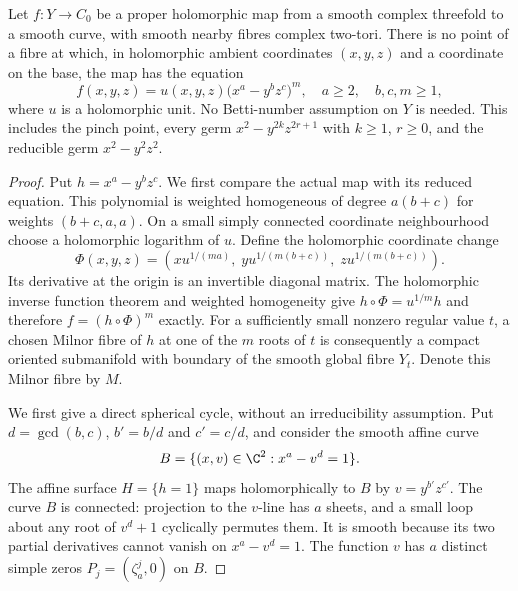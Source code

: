 
\begin{proposition}\label{cdp:st:A.5.15}
Let $f:Y\to C_0$ be a proper holomorphic map from a
smooth complex threefold to a smooth curve, with smooth
nearby fibres complex two-tori. There is no point of
a fibre at which, in holomorphic ambient coordinates
$(x,y,z)$ and a coordinate on the base, the map has
the equation
\[
 f(x,y,z)=u(x,y,z)\bigl(x^a-y^bz^c\bigr)^m,
 \quad a\ge2,\quad b,c,m\ge1,                                    \tag{A.J.33}\label{cdp:eq:A.J.33}
\]
where $u$ is a holomorphic unit. No Betti-number
assumption on $Y$ is needed. This includes the pinch
point, every germ $x^2-y^{2k}z^{2r+1}$ with
$k\ge1$, $r\ge0$, and the reducible germ
$x^2-y^2z^2$.
\end{proposition}
\begin{proof}
Put $h=x^a-y^bz^c$. We first compare the actual map
with its reduced equation. This polynomial is weighted
homogeneous of degree $a(b+c)$ for weights
$(b+c,a,a)$. On a small simply connected coordinate
neighbourhood choose a holomorphic logarithm of $u$.
Define the holomorphic coordinate change
\[
 \Phi(x,y,z)=\left(
 x u^{1/(ma)},\;
 y u^{1/(m(b+c))},\;
 z u^{1/(m(b+c))}\right).
                                                        \tag{A.J.34}\label{cdp:eq:A.J.34}
\]
Its derivative at the origin is an invertible diagonal
matrix. The holomorphic inverse function theorem and
weighted homogeneity give
$h\circ\Phi=u^{1/m}h$ and therefore
$f=(h\circ\Phi)^m$ exactly. For a sufficiently small
nonzero regular value $t$, a chosen Milnor fibre of
$h$ at one of the $m$ roots of $t$ is consequently a
compact oriented submanifold with boundary of the
smooth global fibre $Y_t$. Denote this Milnor fibre
by $M$.

We first give a direct spherical cycle, without an
irreducibility assumption. Put $d=\gcd(b,c)$,
$b'=b/d$ and $c'=c/d$, and consider the smooth affine
curve
\[
 B=\{(x,v)\in\C^2:x^a-v^d=1\}.
\]
The affine surface $H=\{h=1\}$ maps holomorphically
to $B$ by $v=y^{b'}z^{c'}$. The curve $B$ is
connected: projection to the $v$-line has $a$ sheets,
and a small loop about any root of $v^d+1$ cyclically
permutes them. It is smooth because its two partial
derivatives cannot vanish on $x^a-v^d=1$.
The function $v$ has $a$ distinct simple zeros
$P_j=(\zeta_a^j,0)$ on $B$.


\end{proof}
